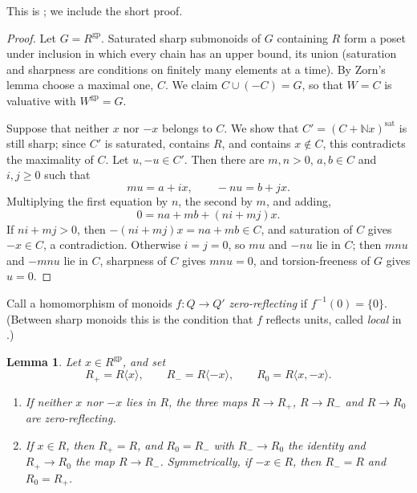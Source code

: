 \documentclass[12pt]{article}
\newcommand{\N}{\mathbb N}
\newcommand{\gp}{\mathrm{gp}}
\newcommand{\sat}{\mathrm{sat}}
\newtheorem{lemma}[theorem]{Lemma}
\theoremstyle{definition}
\theoremstyle{remark}
\begin{document}
This is \cite[Lemma~2.1.2.11]{MW}; we include the short proof.

\begin{proof}
Let \(G=R^{\gp}\).  Saturated sharp submonoids of \(G\) containing \(R\) form
a poset under inclusion in which every chain has an upper bound, its union
(saturation and sharpness are conditions on finitely many elements at a
time).  By Zorn's lemma choose a maximal one, \(C\).  We claim
\(C\cup(-C)=G\), so that \(W=C\) is valuative with \(W^{\gp}=G\).

Suppose that neither \(x\) nor \(-x\) belongs to \(C\).  We show that
\(C'=(C+\N x)^{\sat}\) is still sharp; since \(C'\) is saturated, contains
\(R\), and contains \(x\notin C\), this contradicts the maximality of \(C\).  Let \(u,-u\in C'\).  Then
there are \(m,n>0\), \(a,b\in C\) and \(i,j\geq0\) such that
\[
       mu=a+ix,\qquad -nu=b+jx .
\]
Multiplying the first equation by \(n\), the second by \(m\), and adding,
\[
       0=na+mb+(ni+mj)x.
\]
If \(ni+mj>0\), then \(-(ni+mj)x=na+mb\in C\), and saturation of \(C\) gives
\(-x\in C\), a contradiction.  Otherwise \(i=j=0\), so \(mu\) and \(-nu\) lie
in \(C\); then \(mnu\) and \(-mnu\) lie in \(C\), sharpness of \(C\) gives
\(mnu=0\), and torsion-freeness of \(G\) gives \(u=0\).
\end{proof}

Call a homomorphism of monoids \(f:Q\to Q'\) \emph{zero-reflecting} if
\(f^{-1}(0)=\{0\}\).  (Between sharp monoids this is the condition that
\(f\) reflects units, called \emph{local} in \cite[p.~15]{ogus}.)

\begin{lemma}\label{lem:zero}
Let \(x\in R^{\gp}\), and set
\[
 R_+=R\langle x\rangle,\qquad
 R_-=R\langle -x\rangle,\qquad
 R_0=R\langle x,-x\rangle .
\]
\begin{enumerate}
\item If neither \(x\) nor \(-x\) lies in \(R\), the three maps
\(R\to R_+\), \(R\to R_-\) and \(R\to R_0\) are zero-reflecting.
\item If \(x\in R\), then \(R_+=R\), and \(R_0=R_-\) with \(R_-\to R_0\) the
identity and \(R_+\to R_0\) the map \(R\to R_-\).  Symmetrically, if
\(-x\in R\), then \(R_-=R\) and \(R_0=R_+\).
\end{enumerate}
\end{lemma}
\end{document}
